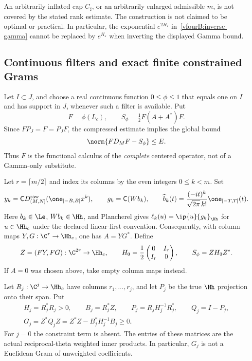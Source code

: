 An arbitrarily inflated cap $C_\sharp$, or an arbitrarily enlarged
admissible $m$, is not covered by the stated rank estimate. The construction
is not claimed to be optimal or practical. In particular, the exponential
$e^{2H_\varepsilon}$ in~\eqref{vfourB:inverse-gamma} cannot be replaced by
$e^{H_\varepsilon}$ when inverting the displayed Gamma bound.

\subsection{Continuous filters and exact finite constrained Grams}
\label{vfourB:gram-section}

Let $I\subset J$, and choose a real continuous function $0\le\phi\le1$
that equals one on $I$ and has support in $J$, whenever such a filter is
available. Put
\begin{equation}\label{vfourB:filtered-operator}
 F=\phi(L_c),\qquad S_\phi=\tfrac12 F(A+A^*)F.
\end{equation}
Since $FP_J=F=P_JF$, the compressed estimate implies the global bound
\begin{equation}\label{vfourB:filtered-error}
 \norm{FD_MF-S_\phi}\le E.
\end{equation}
Thus $F$ is the functional calculus of the \emph{complete} centered
operator, not of a Gamma-only substitute.

Let $r=\lceil m/2\rceil$ and index its columns by the even integers
$0\le k<m$. Set
\[
 y_k=\mathsf C D_{(M,N]}^{\mathrm{raw}}
                     (\one_{[-B,B]}x^k),\qquad
 g_k=\mathsf C(Wb_k),\qquad
 \widehat b_k(t)=\frac{(-it)^k}{\sqrt{2\pi}\,k!}\one_{[-T,T]}(t).
\]
Here $b_k\in\Le$, $Wb_k\in\Hh$, and Plancherel gives
$\ell_k(u)=\ip{u}{g_k}_{\Hh}$ for $u\in\Hh_c$ under the declared
linear-first convention. Consequently, with column maps
$Y,G:\C^r\to\Hh_c$, one has $A=YG^*$. Define
\begin{equation}\label{vfourB:factorization}
 Z=(FY,FG):\C^{2r}\to\Hh_c,\qquad
 H_0=\frac12\begin{pmatrix}0&I_r\\ I_r&0\end{pmatrix},\qquad
 S_\phi=ZH_0Z^*.
\end{equation}
If $A=0$ was chosen above, take empty column maps instead.

Let $R_j:\C^j\to\Hh_c$ have columns $r_1,\ldots,r_j$, and let $P_j$
be the true $\Hh$ projection onto their span. Put
\begin{equation}\label{vfourB:constraint-gram}
 \begin{gathered}
 H_j=R_j^*R_j>0,\qquad B_j=R_j^*Z,\qquad
 P_j=R_jH_j^{-1}R_j^*,\qquad Q_j=I-P_j,\\
 G_j=Z^*Q_jZ=Z^*Z-B_j^*H_j^{-1}B_j\ge0.
 \end{gathered}
\end{equation}
For $j=0$ the constraint term is absent. The entries of these matrices
are the actual reciprocal-theta weighted inner products. In particular,
$G_j$ is not a Euclidean Gram of unweighted coefficients.

